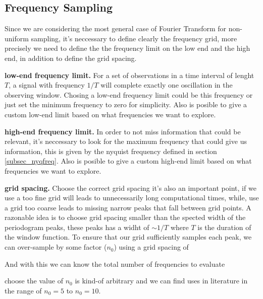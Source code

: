 \subsection{Frequency Sampling}{\label{subsec_freqsampling}}
\newp Since we are considering the most general case of Fourier Transform for non-uniform sampling, it's neccessary to define clearly the frequency grid, more precisely we need to define the the frequency limit on the low end and the high end, in addition to define the grid spacing.
\begin{description}

\item \textbf{low-end frequency limit.} For a set of observations in a time interval of lenght $T$, a signal with frequency $1/T$ will complete exactly one oscillation in the observing window. Chosing a low-end frequency limit could be this frequency or just set the minimum frequency to zero for simplicity. Also is posible to give a custom low-end limit based on what frequencies we want to explore.

\item \textbf{high-end frequency limit.} In order to not miss information that could be relevant, it's neccessary to look for the maximum frequency that could give us information, this is given by the nyquist frequency defined in section \ref{subsec_nyqfreq}. Also is posible to give a custom high-end limit based on what frequencies we want to explore.

\item \textbf{grid spacing.} Choose the correct grid spacing it's also an important point, if we use a too fine grid will leads to unnecessarily long computational times, while, use a grid too coarse leads to missing narrow peaks that fall between grid points. A razonable idea is to choose grid spacing smaller than the spected width of the periodogram peaks, these peaks has a widht of $\sim 1/T$ where $T$ is the duration of the window function. To ensure that our grid sufficiently samples each peak, we can over-sample by some factor ($n_0$) using a grid spacing of


\newp And with this we can know the total number of frequencies to evaluate


\newp choose the value of $n_0$ is kind-of arbitrary and we can find uses in literature in the range of $n_0 = 5$ to $n_0 = 10$.

\end{description}

